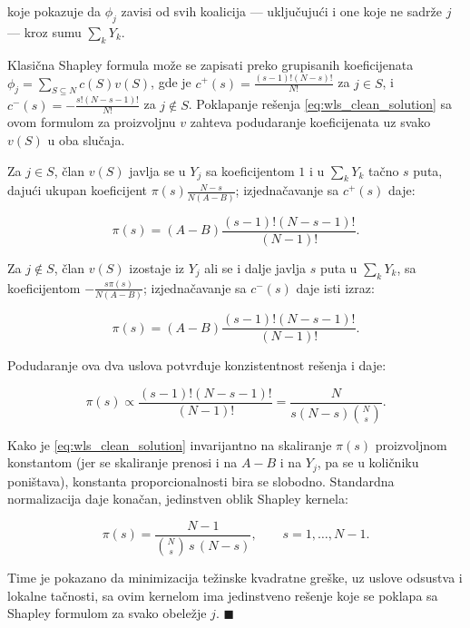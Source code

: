 koje pokazuje da $\phi_j$ zavisi od svih koalicija — uključujući i one koje ne sadrže $j$ — kroz sumu $\sum_k Y_k$.

Klasična Shapley formula može se zapisati preko grupisanih koeficijenata $\phi_j = \sum_{S\subseteq N} c(S)v(S)$, gde je $c^+(s) = \frac{(s-1)!(N-s)!}{N!}$ za $j\in S$, i $c^-(s) = -\frac{s!(N-s-1)!}{N!}$ za $j\notin S$. Poklapanje rešenja \eqref{eq:wls_clean_solution} sa ovom formulom za proizvoljnu $v$ zahteva podudaranje koeficijenata uz svako $v(S)$ u oba slučaja.

Za $j\in S$, član $v(S)$ javlja se u $Y_j$ sa koeficijentom $1$ i u $\sum_k Y_k$ tačno $s$ puta, dajući ukupan koeficijent $\pi(s)\frac{N-s}{N(A-B)}$; izjednačavanje sa $c^+(s)$ daje:

\begin{equation*}
    \pi(s) = (A-B)\frac{(s-1)!(N-s-1)!}{(N-1)!}.
\end{equation*}

Za $j\notin S$, član $v(S)$ izostaje iz $Y_j$ ali se i dalje javlja $s$ puta u $\sum_k Y_k$, sa koeficijentom $-\frac{s\pi(s)}{N(A-B)}$; izjednačavanje sa $c^-(s)$ daje isti izraz:

\begin{equation*}
    \pi(s) = (A-B)\frac{(s-1)!(N-s-1)!}{(N-1)!}.
\end{equation*}

Podudaranje ova dva uslova potvrđuje konzistentnost rešenja i daje:

\begin{equation*}
    \pi(s) \propto \frac{(s-1)!(N-s-1)!}{(N-1)!} = \frac{N}{s(N-s)\binom{N}{s}}.
\end{equation*}

Kako je \eqref{eq:wls_clean_solution} invarijantno na skaliranje $\pi(s)$ proizvoljnom konstantom (jer se skaliranje prenosi i na $A-B$ i na $Y_j$, pa se u količniku poništava), konstanta proporcionalnosti bira se slobodno. Standardna normalizacija daje konačan, jedinstven oblik Shapley kernela:

\begin{equation}
    \pi(s) = \frac{N-1}{\binom{N}{s}\,s\,(N-s)}, \qquad s=1,\dots,N-1.
\end{equation}

Time je pokazano da minimizacija težinske kvadratne greške, uz uslove odsustva i lokalne tačnosti, sa ovim kernelom ima jedinstveno rešenje koje se poklapa sa Shapley formulom za svako obeležje $j$. $\blacksquare$